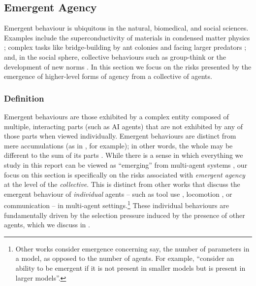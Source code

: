 \subsection{Emergent Agency}
\label{sec:emergent_agency}

Emergent behaviour is ubiquitous in the natural, biomedical, and social sciences.
Examples include the superconductivity of materials in condensed matter physics \citep{anderson_more_1972}; complex tasks like bridge-building by ant colonies and facing larger predators \citep{gordon1996organization,bonabeau_self-organization_1997}; and, in the social sphere, collective behaviours such as group-think or the development of new norms \citep{couzin_collective_2007}.
In this section we focus on the risks presented by the emergence of higher-level forms of agency from a collective of agents.







\subsubsection{Definition}

Emergent behaviours are those exhibited by a complex entity composed of multiple, interacting parts (such as AI agents) that are not exhibited by any of those parts when viewed individually.
Emergent behaviours are distinct from mere accumulations (as in , for example); in other words, the whole may be different to the sum of its parts \citep{anderson_more_1972}.
While there is a sense in which everything we study in this report can be viewed as ``emerging'' from multi-agent systems \citep{Mogul2006,Altmann2024}, our focus on this section is specifically on the risks associated with \textit{emergent agency} at the level of the \textit{collective}.
This is distinct from other works that discuss the emergent behaviour of \emph{individual} agents -- such as tool use \citep{Baker2019}, locomotion \citep{Bansal2018}, or communication \citep{Lazaridou2020} -- in multi-agent settings.\footnote{Other works consider emergence concerning say, the number of parameters in a model, as opposed to the number of agents. For example, \citet{Wei2022} ``consider an ability to be emergent if it is not present in smaller models but is present in larger models''.}
These individual behaviours are fundamentally driven by the selection pressure induced by the presence of other agents, which we discuss in .

